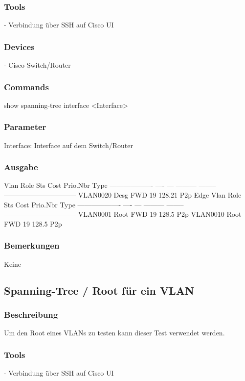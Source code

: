 \documentclass[a4,12pt]{scrartcl}
\begin{document}
\subsubsection{Tools}
- Verbindung über SSH auf Cisco UI
\subsubsection{Devices}
- Cisco Switch/Router
\subsubsection{Commands}
show spanning-tree interface <Interface>
\subsubsection{Parameter}
Interface: Interface auf dem Switch/Router
\subsubsection{Ausgabe}
Vlan                Role Sts Cost      Prio.Nbr Type\newline
------------------- ---- --- --------- -------- --------------------------------\newline
VLAN0020            Desg FWD 19        128.21   P2p Edge\newline
Vlan                Role Sts Cost      Prio.Nbr Type\newline
------------------- ---- --- --------- -------- --------------------------------\newline
VLAN0001            Root FWD 19        128.5    P2p\newline
VLAN0010            Root FWD 19        128.5    P2p\newline
\subsubsection{Bemerkungen}
Keine




\subsection{Spanning-Tree / Root für ein VLAN}
\subsubsection{Beschreibung}
Um den Root eines VLANs zu testen kann dieser Test verwendet werden.
\subsubsection{Tools}
- Verbindung über SSH auf Cisco UI 
\end{document}
